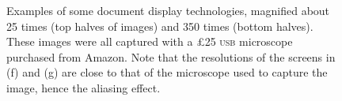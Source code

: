 \begin{figure}
\begin{centering}
		 \hspace{1mm} 
		 \hspace{1mm} 

	\end{centering}

	\caption[Examples of document display technologies]{Examples of some document display technologies, magnified about 25 times (top halves of images) and 350 times (bottom halves). These images were all captured with a \pounds 25 \textsc{usb} microscope purchased from Amazon. Note that the resolutions of the screens in (f) and (g) are close to that of the microscope used to capture the image, hence the aliasing effect.}
	\label{fig:screens}
\end{figure}


